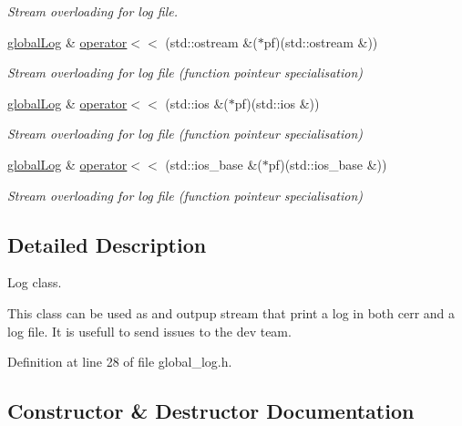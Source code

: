 \begin{DoxyCompactItemize}
\begin{DoxyCompactList}\small\item\em Stream overloading for log file. \end{DoxyCompactList}\item 
\hyperlink{classglobal_log}{global\+Log} \& \hyperlink{classglobal_log_a9fd368182e141dde5923ba8a6e559b3b}{operator$<$$<$} (std\+::ostream \&($\ast$pf)(std\+::ostream \&))
\begin{DoxyCompactList}\small\item\em Stream overloading for log file (function pointeur specialisation) \end{DoxyCompactList}\item 
\hyperlink{classglobal_log}{global\+Log} \& \hyperlink{classglobal_log_a8abfc695fe7cc6fd17112f5222482236}{operator$<$$<$} (std\+::ios \&($\ast$pf)(std\+::ios \&))
\begin{DoxyCompactList}\small\item\em Stream overloading for log file (function pointeur specialisation) \end{DoxyCompactList}\item 
\hyperlink{classglobal_log}{global\+Log} \& \hyperlink{classglobal_log_a390c36e15e827bcd6d10a66a9b882cae}{operator$<$$<$} (std\+::ios\+\_\+base \&($\ast$pf)(std\+::ios\+\_\+base \&))
\begin{DoxyCompactList}\small\item\em Stream overloading for log file (function pointeur specialisation) \end{DoxyCompactList}\end{DoxyCompactItemize}


\subsection{Detailed Description}
Log class. 

This class can be used as and outpup stream that print a log in both cerr and a log file. It is usefull to send issues to the dev team. 

Definition at line 28 of file global\+\_\+log.\+h.



\subsection{Constructor \& Destructor Documentation}
\hypertarget{classglobal_log_a773588391d5e6593678e98b22c30529f}{}\label{classglobal_log_a773588391d5e6593678e98b22c30529f} 
